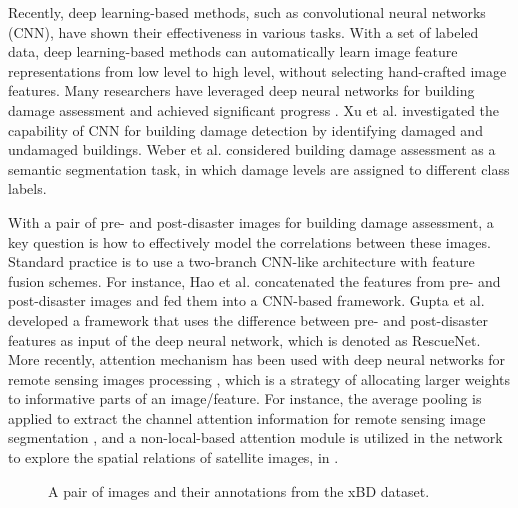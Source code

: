 \documentclass[journal]{IEEEtran}
\begin{document}
Recently, deep learning-based methods, such as convolutional neural networks (CNN), have shown their effectiveness in various tasks. With a set of labeled data, deep learning-based methods can automatically learn image feature representations from low level to high level, without selecting hand-crafted image features. Many researchers have leveraged deep neural networks for building damage assessment and achieved significant progress  \cite{jiFullyConvolutionalNetworks2019,xu2019building,weber2020building}. 
Xu et al. \cite{xu2019building} investigated the capability of CNN for building damage detection by identifying damaged and undamaged buildings.
Weber et al. \cite{weber2020building} considered building damage assessment as a semantic segmentation task, in which damage levels are assigned to different class labels.

With a pair of pre- and post-disaster images for building damage assessment, a key question is how to effectively model the correlations between these images.
Standard practice is to use a two-branch CNN-like architecture with feature fusion schemes. For instance, Hao et al. \cite{hao2020attention} concatenated the features from pre- and post-disaster images and fed them into a CNN-based framework. 
Gupta et al. \cite{gupta2020rescuenet} developed a framework that uses the difference between pre- and post-disaster features as input of the deep neural network, which is denoted as RescueNet. More recently, attention mechanism has been used with deep neural networks for remote sensing images processing \cite{liuAFNetAdaptiveFusion2020, wangMultiscaleVisualAttention2019}, which is a strategy of allocating larger weights to  informative parts of an image/feature. For instance, the average pooling is applied to extract the channel attention information for remote sensing image segmentation \cite{luoHighResolutionAerialImages2019}, and a non-local-based attention module is utilized in the network to explore the spatial relations of satellite images, in \cite{hao2020attention}.

\begin{figure}[t]
	\centering
	\caption{A pair of images and their annotations from the xBD dataset.}
	\label{figImageInstance}
\end{figure}
\end{document}
